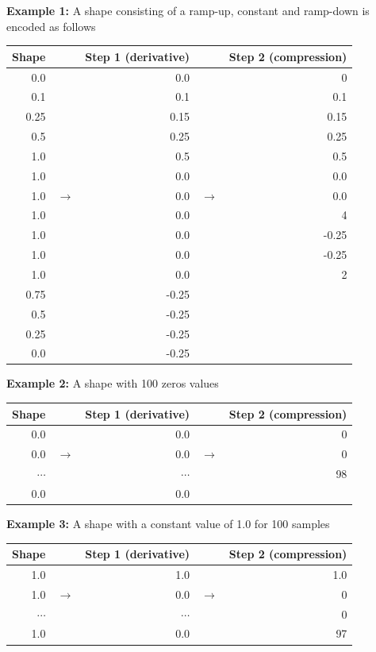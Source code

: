 \documentclass{article}
\begin{document}
\textbf{Example 1: } A shape consisting of a ramp-up, constant and ramp-down is encoded as follows
\vspace{-1em}
\begin{center}
\begin{tabular}{rrrrr}
\toprule
Shape & & Step 1 (derivative) && Step 2 (compression) \\
\midrule
0.0 && 0.0 && 0 \\
0.1 && 0.1 && 0.1 \\
0.25&& 0.15&& 0.15 \\
0.5 && 0.25&& 0.25 \\
1.0 && 0.5 && 0.5 \\
1.0 && 0.0 && 0.0 \\
1.0 & $\rightarrow$& 0.0 & $\rightarrow$ & 0.0 \\
1.0 && 0.0 && 4 \\
1.0 && 0.0 && -0.25 \\
1.0 && 0.0 && -0.25 \\
1.0 && 0.0 && 2 \\
0.75&& -0.25 \\
0.5 && -0.25 \\
0.25&& -0.25 \\
0.0 && -0.25 \\
\bottomrule
\end{tabular}
\end{center}

\textbf{Example 2: } A shape with 100 zeros values
\vspace{-1em}
\begin{center}
\begin{tabular}{rrrrr}
\toprule
Shape & & Step 1 (derivative) && Step 2 (compression) \\
\midrule
0.0 && 0.0 && 0 \\
0.0 & $\rightarrow$ & 0.0 & $\rightarrow$ & 0 \\
$\cdots$ &  & $\cdots$ &  & 98 \\
0.0 && 0.0 &&  \\
\bottomrule
\end{tabular}
\end{center}

\textbf{Example 3: } A shape with a constant value of 1.0 for 100 samples
\vspace{-1em}
\begin{center}
\begin{tabular}{rrrrr}
\toprule
Shape & & Step 1 (derivative) && Step 2 (compression) \\
\midrule
1.0 && 1.0 && 1.0 \\
1.0 & $\rightarrow$ & 0.0 & $\rightarrow$ & 0 \\
$\cdots$ &  & $\cdots$  &  & 0 \\
1.0 && 0.0 &&  97 \\
\bottomrule
\end{tabular}
\end{center}
\end{document}
